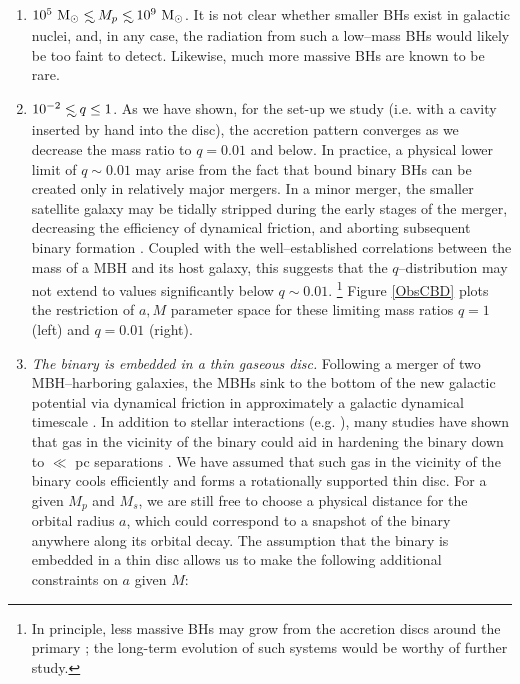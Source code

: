 \begin{enumerate}
	\item{$10^5~{\rm M_\odot} \lsim M_p \lsim 10^9~{\rm M_\odot}$. It is not clear whether smaller BHs exist in galactic nuclei, and, in any case,
	the radiation from such a low--mass BHs would likely be too faint to
	detect.  Likewise, much more massive BHs are known to be rare.} 
%
	\item{$10^{-2}\lsim q \leq 1$. As we have shown, for the set-up we study (i.e. with a cavity inserted
	by hand into the disc), the accretion pattern converges as we decrease
	the mass ratio to $q=0.01$ and below. In practice, a physical lower limit of $q\sim
	0.01$ may arise from the fact that bound binary BHs can be
	created only in relatively major mergers. 
	In a minor merger, the smaller satellite galaxy may be tidally stripped
	during the early stages of the merger, decreasing the efficiency of dynamical friction, 
	and aborting subsequent binary formation \citep{Callegari+:2009}.
 	Coupled with the well--established correlations
	between the mass of a MBH and its host galaxy, this suggests that the
	$q$--distribution may not extend to values significantly below $q\sim
	0.01$.  \footnote{In principle, less massive BHs may grow from the
 	 accretion discs around the primary \citep{McKernan+2012}; the
	  long-term evolution of such systems would be worthy of further  study.}
	 Figure \ref{ObsCBD} plots the restriction of $a, M$ parameter space for 
	 these limiting mass ratios $q=1$ (left) and $q=0.01$ (right).}
%
	\item{\textit{The binary is embedded in a thin gaseous disc.} Following a merger of two MBH--harboring galaxies, the MBHs sink to
	the bottom of the new galactic potential via dynamical friction in
	approximately a galactic dynamical timescale
	\citep{Begel:Blan:Rees:1980}. In addition to stellar interactions
	(e.g. \citealt{Preto:2011}), many studies have shown that gas in the
	vicinity of the binary could aid in hardening the binary down to $\ll$
	pc separations \citep[\textit{e.g.}][]
	{Escala:2005,Dotti:2007,Mayer+2007,Lodato:2009,Cuadra:2009,Nixon:2011:LongSim,Chapon+2013}.
	We have assumed that such gas in the vicinity of the binary cools
	efficiently and forms a rotationally supported thin disc.  For a given
	$M_p$ and $M_s$, we are still free to choose a physical distance for
	the orbital radius $a$, which could correspond to a snapshot of the
	binary anywhere along its orbital decay.  The assumption that the binary is embedded in a thin disc allows us to make the following additional constraints on $a$ given $M$:
}
\end{enumerate}
